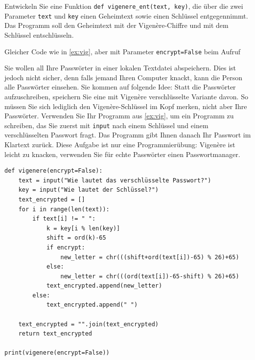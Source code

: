\begin{myexercise}
    Entwickeln Sie eine Funktion \lstinline|def vigenere_ent(text, key)|, die über die zwei Parameter \lstinline|text| und \lstinline|key| einen Geheimtext sowie einen Schlüssel entgegennimmt. Das Programm soll den Geheimtext mit der Vigenère-Chiffre und mit dem Schlüssel entschlüsseln.

    \begin{myanswer}
        Gleicher Code wie in \cref{ex:vig}, aber mit Parameter \lstinline|encrypt=False| beim Aufruf
    \end{myanswer}
\end{myexercise}

\begin{mychallenge}
    Sie wollen all Ihre Passwörter in einer lokalen Textdatei abspeichern. Dies ist jedoch nicht sicher, denn falls jemand Ihren Computer knackt, kann die Person alle Passwörter einsehen. Sie kommen auf folgende Idee: Statt die Passwörter aufzuschreiben, speichern Sie eine mit Vigenère verschlüsselte Variante davon. So müssen Sie sich lediglich den Vigenère-Schlüssel im Kopf merken, nicht aber Ihre Passwörter. Verwenden Sie Ihr Programm aus \cref{ex:vig}, um ein Programm zu schreiben, das Sie zuerst mit \lstinline|input| nach einem Schlüssel und einem verschlüsselten Passwort fragt. Das Programm gibt Ihnen danach Ihr Passwort im Klartext zurück. Diese Aufgabe ist nur eine Programmierübung: Vigenère ist leicht zu knacken, verwenden Sie für echte Passwörter einen Passwortmanager.
    \begin{myanswer}
        \begin{lstlisting}
def vigenere(encrypt=False):
    text = input("Wie lautet das verschlüsselte Passwort?")
    key = input("Wie lautet der Schlüssel?")
    text_encrypted = []
    for i in range(len(text)):
        if text[i] != " ":
            k = key[i % len(key)]
            shift = ord(k)-65
            if encrypt:
                new_letter = chr(((shift+ord(text[i])-65) % 26)+65)
            else:
                new_letter = chr(((ord(text[i])-65-shift) % 26)+65)
            text_encrypted.append(new_letter)
        else:
            text_encrypted.append(" ")

    text_encrypted = "".join(text_encrypted)
    return text_encrypted

print(vigenere(encrypt=False))
\end{lstlisting}
    \end{myanswer}
\end{mychallenge}

